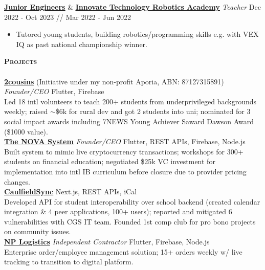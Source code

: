 \documentclass[a4paper]{article}
\newcommand{\lineunder} {
    \vspace*{-8pt} \\
    \hspace*{-10pt} \hrulefill \\
}
\newcommand{\header} [1] {
    {\hspace*{-10pt}\vspace*{6pt} \large\textsc{\textbf{#1}}}
    \vspace*{-6pt} \lineunder
}
\begin{document}
\textbf{\href{https://www.juniorengineers.com.au/}{\ul{Junior Engineers}}} \& \textbf{\href{https://innovatetechacademy.com/}{\ul{Innovate Technology Robotics Academy}}} \textit{Teacher} \hfill Dec 2022 - Oct 2023 // Mar 2022 - Jun 2022\\
\vspace{-3.5mm}
\begin{itemize} \itemsep 0.5pt
    \item Tutored young students, building robotics/programming skills e.g. with VEX IQ as past national championship winner.
\end{itemize}
\vspace{-2.5mm}

\vspace*{1mm}
\header{Projects}
\href{https://2cousins.org/}{\textbf{\ul{2cousins}}} (Initiative under my non-profit Aporia, ABN: 87127315891) \textit{Founder/CEO} {\textsl{\hfill} Flutter, Firebase}\\
Led 18 intl volunteers to teach 200+ students from underprivileged backgrounds weekly; raised $\sim$\$6k for rural dev and got 2 students into uni; nominated for 3 social impact awards including 7NEWS Young Achiever Saward Dawson Award (\$1000 value).\\
\vspace*{1.5mm}
\href{https://the-nova-system.github.io/}{\textbf{\ul{The NOVA System}}} \textit{Founder/CEO} {\textsl{\hfill} Flutter, REST APIs, Firebase, Node.js}\\
Built system to mimic live cryptocurrency transactions; workshops for 300+ students on financial education; negotiated \$25k VC investment for implementation into intl IB curriculum before closure due to provider pricing changes.\\
\vspace*{1.5mm}
\href{https://caulfieldsync.vercel.app/}{\textbf{\ul{CaulfieldSync}}} {\textsl{\hfill} Next.js, REST APIs, iCal}\\
Developed API for student interoperability over school backend (created calendar integration \& 4 peer applications, 100+ users); reported and mitigated 6 vulnerabilities with CGS IT team.
Founded 1st comp club for pro bono projects on community issues.\\
\vspace*{1.5mm}
\href{https://nplogistics.com.au}{\textbf{\ul{NP Logistics}}} \textit{Independent Contractor} {\textsl{\hfill} Flutter, Firebase, Node.js}\\
Enterprise order/employee management solution; 15+ orders weekly w/ live tracking to transition to digital platform.\\
\vspace*{1.5mm}
\end{document}
